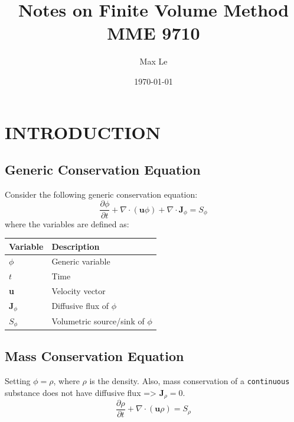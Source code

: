 \documentclass[11pt]{article}
\author{Max Le}
\date{\today}
\title{Notes on Finite Volume Method MME 9710}
\begin{document}
\maketitle
\tableofcontents




\lstset{style=mystyle}



\section{INTRODUCTION}
\label{sec:org9aaa8a5}
\subsection{Generic Conservation Equation}
\label{sec:orgbe9106b}
Consider the following generic conservation equation:
\begin{equation}
\frac{\partial \phi}{\partial t} + \nabla \cdot (\textbf{u}\phi) + \nabla \cdot \textbf{J}_\phi = S_\phi
\end{equation}
where the variables are defined as:


\begin{center}
\begin{tabular}{ll}
\textbf{Variable} & \textbf{Description}\\
\hline
\(\phi\) & Generic variable\\
\(t\) & Time\\
\textbf{u} & Velocity vector\\
\(\textbf{J}_\phi\) & Diffusive flux of \(\phi\)\\
\(S_\phi\) & Volumetric source/sink of \(\phi\)\\
\hline
\end{tabular}
\end{center}

\subsection{Mass Conservation Equation}
\label{sec:org1e195cd}
Setting \(\phi = \rho\), where \(\rho\) is the density. Also, mass conservation of a \texttt{continuous} substance does not
have diffusive flux => \(\textbf{J}_\rho = 0\).
\begin{equation}
\frac{\partial \rho}{\partial t} + \nabla \cdot (\textbf{u}\rho) = S_\rho
\end{equation}
\end{document}
